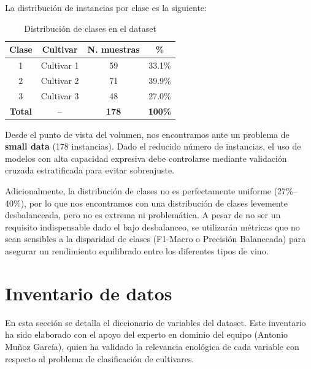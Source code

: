 La distribuci\'on de instancias por clase es la siguiente:

\begin{table}[H]
    \centering
    \caption{Distribuci\'on de clases en el dataset}
    \begin{tabular}{cccc}
        \toprule
        \textbf{Clase} & \textbf{Cultivar} & \textbf{N.\textordmasculine{} muestras} & \textbf{\%} \\
        \midrule
        1              & Cultivar 1        & 59   & 33.1\% \\
        2              & Cultivar 2        & 71   & 39.9\% \\
        3              & Cultivar 3        & 48   & 27.0\% \\
        \midrule
        \textbf{Total} & --                & \textbf{178} & \textbf{100\%} \\
        \bottomrule
    \end{tabular}
    \label{tab:clases}
\end{table}

\vspace{0.5cm}

Desde el punto de vista del volumen, nos encontramos ante un problema de
\textbf{small data} (178 instancias). Dado el reducido número de instancias, el uso de modelos con alta capacidad expresiva debe controlarse mediante validación cruzada estratificada para evitar sobreajuste.

\vspace{1.5mm}

Adicionalmente, la distribución de clases no es perfectamente uniforme (27\%–40\%), por lo que nos encontramos con una distribución de clases levemente desbalanceada, pero no es extrema ni problemática. A pesar de no ser un requisito indispensable dado el bajo desbalanceo, se utilizarán métricas que no sean sensibles a la disparidad de clases (F1-Macro o Precisión Balanceada) para asegurar un rendimiento equilibrado entre los diferentes tipos de vino. 

\section{Inventario de datos}

En esta secci\'on se detalla el diccionario de variables del dataset. Este inventario
ha sido elaborado con el apoyo del experto en dominio del equipo (Antonio Mu\~noz
Garc\'ia), quien ha validado la relevancia enol\'ogica de cada variable con respecto
al problema de clasificaci\'on de cultivares.

